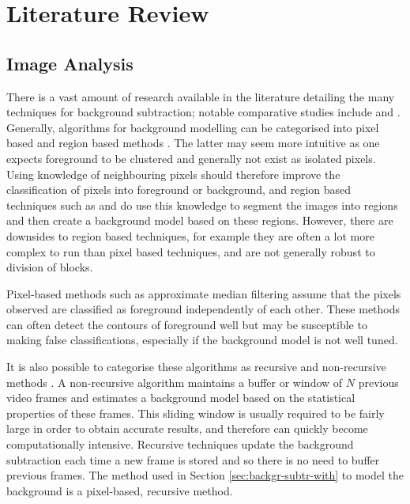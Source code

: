 %							

%								

\chapter{Literature Review}

\section{Image Analysis}
\label{sec:sequ-monte-carlo}




There is a vast amount of research available  in the literature detailing the many techniques for background subtraction; notable comparative studies include \cite{Sen-Ching2004} and \cite{Piccardi2004a}. Generally, algorithms for background modelling  can be categorised into pixel based and region based methods  \cite{Bouwmans2011}. The latter may seem more intuitive as one expects foreground to be clustered and generally not exist as isolated pixels. Using knowledge of neighbouring pixels should therefore improve the classification of pixels into foreground or background, and region based techniques such as  \cite{elgammal2000} and \cite{toyama1999} do use this knowledge to segment the images into regions and then create a background model based on these regions. However, there are downsides to region based techniques, for example they are often a lot more complex to run than pixel based techniques, and are not generally robust to division of blocks.

Pixel-based methods such as approximate median filtering \cite{McFarlane1995} assume that the pixels observed are classified as foreground independently of each other. These methods can often detect the contours of foreground well but may be susceptible to making false classifications, especially if the background model is not well tuned.  

It is also possible to categorise these algorithms as recursive and non-recursive methods \cite{Bouwmans2011}. A non-recursive algorithm maintains a buffer or window of $N$ previous video frames and estimates a background model based on the statistical properties of these frames. This sliding window is usually required to be fairly large in order to obtain accurate results, and therefore can quickly become computationally intensive. Recursive techniques update the background subtraction each time a new frame is stored and so there is no need to buffer previous frames. The method used in Section \ref{sec:backgr-subtr-with} to model the background is a pixel-based, recursive method.


